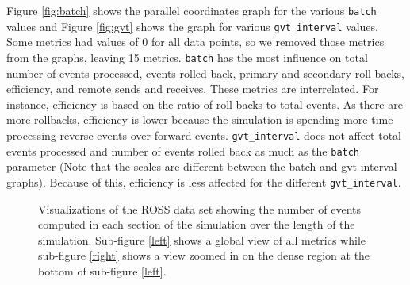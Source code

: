 \documentclass[12pt]{article}
\begin{document}
Figure \ref{fig:batch} shows the parallel coordinates graph for the various \texttt{batch} values and Figure \ref{fig:gvt} shows the graph for various \texttt{gvt\_interval} values.  Some metrics had values of 0 for all data points, so we removed those metrics from the graphs, leaving 15 metrics.   \texttt{batch} has the most influence on total number of events processed, events rolled back, primary and secondary roll backs,  efficiency, and remote sends and receives.  These metrics are interrelated. For instance, efficiency is based on the ratio of roll backs to total events.  As there are more rollbacks, efficiency is lower because the simulation is spending more time processing reverse events over forward events.  \texttt{gvt\_interval} does not affect total events processed and number of events rolled back as much as the \texttt{batch} parameter (Note that the scales are different between the batch and gvt-interval graphs).  Because of this, efficiency is less affected for the different \texttt{gvt\_interval}.  
\begin{figure}[!ht]
     \centering
     \caption{Visualizations of the ROSS data set showing the number of events computed in each section of the simulation over the length of the simulation. Sub-figure \ref{left} shows a global view of all metrics while sub-figure \ref{right} shows a view zoomed in on the dense region at the bottom of sub-figure \ref{left}.}
     \label{Area}
\end{figure}
\end{document}
